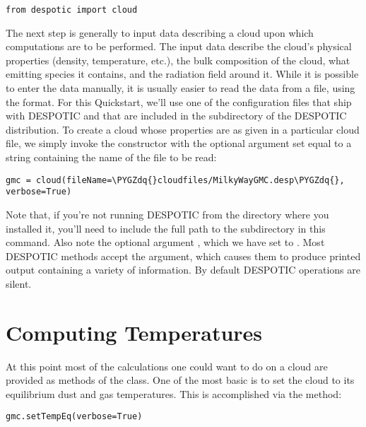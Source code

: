 \documentclass[letterpaper,10pt,english]{sphinxmanual}
\def\PYGZdq{\char`\"}
\begin{document}
\begin{Verbatim}[commandchars=\\\{\}]
from despotic import cloud
\end{Verbatim}

The next step is generally to input data describing a cloud upon which
computations are to be performed. The input data describe the cloud's
physical properties (density, temperature, etc.), the bulk composition
of the cloud, what emitting species it contains, and the radiation
field around it. While it is possible to enter the data manually, it
is usually easier to read the data from a file, using the
{\hyperref[cloudfiles:sec\string-cloudfiles]{}} format. For this Quickstart, we'll use one of
the configuration files that ship with DESPOTIC and that are
included in the  subdirectory of the DESPOTIC
distribution. To create a cloud whose properties are as given in
a particular cloud file, we simply invoke the constructor with
the  optional argument set equal to a string containing
the name of the file to be read:

\begin{Verbatim}[commandchars=\\\{\}]
gmc = cloud(fileName=\PYGZdq{}cloudfiles/MilkyWayGMC.desp\PYGZdq{}, verbose=True)
\end{Verbatim}

Note that, if you're not running DESPOTIC from the directory where you
installed it, you'll need to include the full path to the 
subdirectory in this command. Also note the optional argument
, which we have set to . Most DESPOTIC methods
accept the  argument, which causes them to produce printed
output containing a variety of information. By default DESPOTIC
operations are silent.


\section{Computing Temperatures}
\label{quickstart:computing-temperatures}
At this point most of the calculations one could want to do on a cloud
are provided as methods of the  class. One of the most basic is
to set the cloud to its equilibrium dust and gas temperatures. This is
accomplished via the  method:

\begin{Verbatim}[commandchars=\\\{\}]
gmc.setTempEq(verbose=True)
\end{Verbatim}
\end{document}
